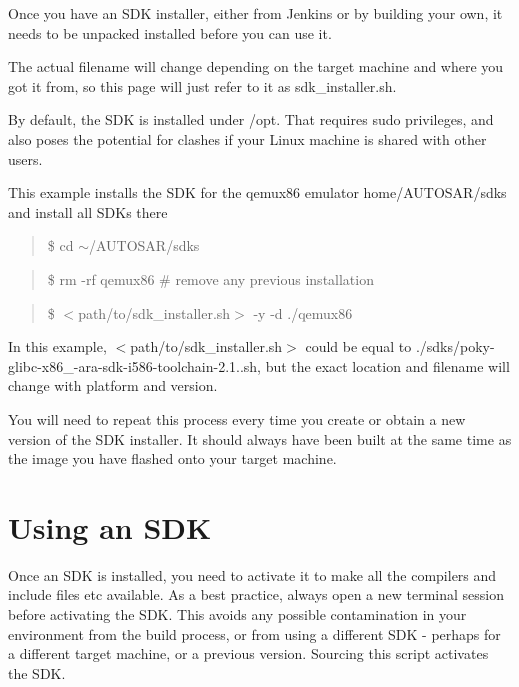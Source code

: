 \begin{DoxyItemize}
\item Once you have an S\+DK installer, either from Jenkins or by building your own, it needs to be unpacked installed before you can use it.
\item The actual filename will change depending on the target machine and where you got it from, so this page will just refer to it as sdk\+\_\+installer.\+sh.
\item By default, the S\+DK is installed under /opt. That requires sudo privileges, and also poses the potential for clashes if your Linux machine is shared with other users.
\item This example installs the S\+DK for the qemux86 emulator home/\+A\+U\+T\+O\+S\+A\+R/sdks and install all S\+D\+Ks there
\end{DoxyItemize}

\begin{quote}
\$ cd $\sim$/\+A\+U\+T\+O\+S\+A\+R/sdks \end{quote}


\begin{quote}
\$ rm -\/rf qemux86 \# remove any previous installation \end{quote}


\begin{quote}
\$ $<$path/to/sdk\+\_\+installer.\+sh$>$ -\/y -\/d ./qemux86 \end{quote}



\begin{DoxyItemize}
\item In this example, $<$path/to/sdk\+\_\+installer.\+sh$>$ could be equal to ./sdks/poky-\/glibc-\/x86\+\_-\/ara-\/sdk-\/i586-\/toolchain-\/2.1..\+sh, but the exact location and filename will change with platform and version.
\item You will need to repeat this process every time you create or obtain a new version of the S\+DK installer. It should always have been built at the same time as the image you have flashed onto your target machine.
\end{DoxyItemize}

\section*{Using an S\+DK}

Once an S\+DK is installed, you need to activate it to make all the compilers and include files etc available. As a best practice, always open a new terminal session before activating the S\+DK. This avoids any possible contamination in your environment from the build process, or from using a different S\+DK -\/ perhaps for a different target machine, or a previous version. Sourcing this script activates the S\+DK.

